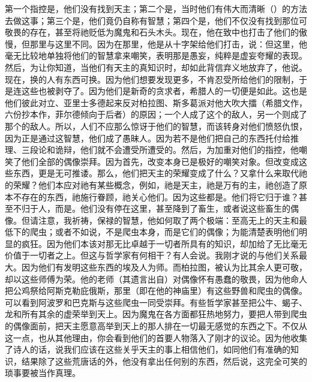 第一个指控是，他们没有找到天主；第二个是，当时他们有伟大而清晰（）的方法去做这事；第三个是，他们竟仍自称有智慧；第四个是，他们不仅没有找到那位可敬畏的存在，甚至将祂贬低为魔鬼和石头木头。现在，他在致中也打击了他们的傲慢，但那里与这里不同。因为在那里，他是从十字架给他们打击，说：但这里，他毫无比较地单独将他们的智慧拿来嘲笑，表明那是愚妄，纯粹是虚妄夸耀的表现。然后，为让你知道，当他们有天主的真知识时，却如此背信弃义地放弃了，他说。现在，换的人有东西可换。因为他们想要发现更多，不肯忍受所给他们的限制，于是连这些也被剥夺了。因为他们是新奇的贪求者，希腊人的一切便是如此。这也是他们彼此对立、亚里士多德起来反对柏拉图、斯多葛派对他大吹大擂（希腊文作，六份抄本作，菲尔德倾向于后者）的原因；一个人成了这个的敌人，另一个则成了那个的敌人。所以，人们不应那么惊讶于他们的智慧，而该转身对他们愤怒仇恨，因为正是通过这智慧，他们成了愚昧人。因为若不是他们把自己的东西托付给推理、三段论和诡辩，他们就不会遭受所遭受的。然后，为加重对他们的指控，他嘲笑了他们全部的偶像崇拜。因为首先，改变本身已是极好的嘲笑对象。但改变成这些东西，更是无可推诿。那么，他们把天主的荣耀变成了什么？又拿什么来取代祂的荣耀？他们本应对祂有某些概念，例如，祂是天主，祂是万有的主，祂创造了原本不存在的东西，祂施行眷顾，祂关心他们。因为这些都是。他们将它归于谁？甚至不归于人，而是。他们没有停在这里，甚至降到了畜生，或者说这些畜生的偶像。但请注意，我祈祷，保禄的智慧，他如何取了两个极端：至高无上的天主和最低下的爬虫；或者不如说，不是爬虫本身，而是它们的偶像；为能清楚表明他们明显的疯狂。因为他们本该对那无比卓越于一切者所具有的知识，却加给了无比毫无价值于一切者之上。但这与哲学家有何相干？有人会说。我刚才说的与他们关系最大。因为他们有发明这些东西的埃及人为师。而柏拉图，被认为比其余人更可敬，却以这些师傅为荣。他的老师（其遗言出自）对偶像怀有愚蠢的敬畏，因为他命人把公鸡祭给阿斯克勒庇俄斯，那里（即在他的神庙里）有这些野兽和爬虫的偶像。可以看到阿波罗和巴克斯与这些爬虫一同受崇拜。有些哲学家甚至把公牛、蝎子、龙和所有其余的虚荣举到天上。因为魔鬼在各方面都狂热地努力，要把人带到爬虫的偶像面前，把天主愿意高举到天上的那人排在一切最无感觉的东西之下。不仅从这一点，也从其他理由，你会看到他们的首要人物落入了刚才的议论。因为他收集了诗人的话，说我们应该在这些关乎天主的事上相信他们，如同他们有准确的知识，结果除了这些荒唐话的外，他没有拿出任何别的东西，然后说，这完全可笑的琐事要被当作真理。\par

